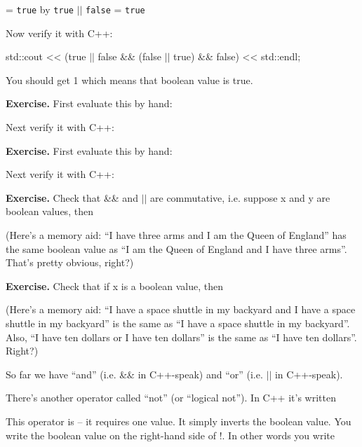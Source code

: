 = \texttt{true}                             by \texttt{true} $||$ \texttt{false} = \texttt{true}

Now verify it with C++:
\begin{console}
std::cout << (true $||$ false && (false $||$ true) && false)
          << std::endl;
\end{console}

You should get 1 which means that boolean value is true.

\textbf{Exercise.} First evaluate this by hand:

  
Next verify it with C++:

\textbf{Exercise.} First evaluate this by hand:


Next verify it with C++:

\textbf{Exercise.} Check that \&\& and $||$ are commutative, i.e. suppose x and y are boolean values, then



(Here's a memory aid: “I have three arms and I am the Queen of England” has the same boolean value as “I am the Queen of England and I have three arms”. That's pretty obvious, right?)

\textbf{Exercise.} Check that if x is a boolean value, then



(Here's a memory aid: “I have a space shuttle in my backyard and I have
a space shuttle in my backyard” is the same as “I have a space shuttle in
my backyard”. Also, “I have ten dollars or I have ten dollars” is the same
as “I have ten dollars”. Right?)


So far we have “and” (i.e. \&\& in C++-speak) and “or” (i.e. $||$ in C++-speak).

There's another operator called “not” (or “logical not”). In C++ it's written

\tab[15em]\EMPHASIZE{\textbf{!}}

This operator is  – it requires one value. It simply inverts the boolean value. You write the boolean value on the right-hand side of !. In
other words you write

